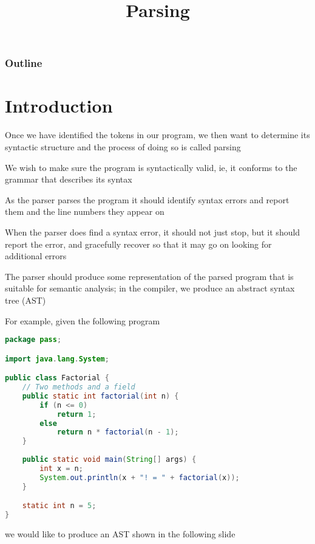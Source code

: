 \documentclass[8pt,a4paper,compress]{beamer}
\title{Parsing}
\date{}
\begin{document}
\begin{frame}
\vfill
\titlepage
\end{frame}

\begin{frame}
\frametitle{Outline}
\tableofcontents
\end{frame}

\section{Introduction}
\begin{frame}[fragile]
\pause

Once we have identified the tokens in our program, we then want to determine its syntactic structure and the process of doing so is called parsing

\pause
\bigskip

We wish to make sure the program is syntactically valid, ie, it conforms to the grammar that describes its syntax

\pause
\bigskip

As the parser parses the program it should identify syntax errors and report them and the line numbers they appear on

\pause
\bigskip

When the parser does find a syntax error, it should not just stop, but it should report the error, and gracefully recover so that it may go on looking for additional errors

\pause
\bigskip

The parser should produce some representation of the parsed program that is suitable for semantic analysis; in the \jmm compiler, we produce an abstract syntax tree (AST)
\end{frame}

\begin{frame}[fragile]
\pause

For example, given the following \jmm program

\begin{lstlisting}[language=Java]
package pass;

import java.lang.System;

public class Factorial {
    // Two methods and a field
    public static int factorial(int n) {
        if (n <= 0)
            return 1;
        else
            return n * factorial(n - 1);
    }
    
    public static void main(String[] args) {
        int x = n;
        System.out.println(x + "! = " + factorial(x));
    }

    static int n = 5;
}
\end{lstlisting}
we would like to produce an AST shown in the following slide
\end{frame}
\end{document}
